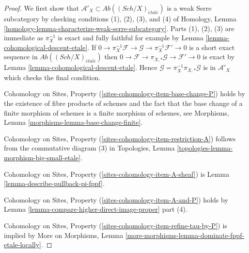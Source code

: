 \documentclass[10pt,a4paper]{amsart}
\theoremstyle{plain}
\theoremstyle{definition}
\theoremstyle{remark}
\numberwithin{equation}{subsection}
\def\Sch{\mathit{Sch}}
\def\etale{{\acute{e}tale}}
\begin{document}
\begin{proof}
We first show that $\mathcal{A}'_X \subset \textit{Ab}((\Sch/X)_\etale)$
is a weak Serre subcategory by checking conditions (1), (2), (3), and (4)
of Homology, Lemma \ref{homology-lemma-characterize-weak-serre-subcategory}.
Parts (1), (2), (3) are immediate as $\pi_X^{-1}$ is exact and
fully faithful for example by Lemma \ref{lemma-cohomological-descent-etale}. If
$0 \to \pi_X^{-1}\mathcal{F} \to \mathcal{G} \to \pi_X^{-1}\mathcal{F}' \to 0$
is a short exact sequence in $\textit{Ab}((\Sch/X)_\etale)$
then $0 \to \mathcal{F} \to \pi_{X, *}\mathcal{G} \to \mathcal{F}' \to 0$
is exact by Lemma \ref{lemma-cohomological-descent-etale}.
Hence $\mathcal{G} = \pi_X^{-1}\pi_{X, *}\mathcal{G}$ is in
$\mathcal{A}'_X$ which checks the final condition.

\medskip\noindent
Cohomology on Sites, Property (\ref{sites-cohomology-item-base-change-P}) holds
by the existence of fibre products of schemes
and the fact that the base change of a finite morphism of
schemes is a finite morphism of schemes, see
Morphisms, Lemma \ref{morphisms-lemma-base-change-finite}.

\medskip\noindent
Cohomology on Sites, Property (\ref{sites-cohomology-item-restriction-A})
follows from the commutative diagram (3) in
Topologies, Lemma \ref{topologies-lemma-morphism-big-small-etale}.

\medskip\noindent
Cohomology on Sites, Property (\ref{sites-cohomology-item-A-sheaf}) is
Lemma \ref{lemma-describe-pullback-pi-fppf}.

\medskip\noindent
Cohomology on Sites, Property (\ref{sites-cohomology-item-A-and-P}) holds by
Lemma \ref{lemma-compare-higher-direct-image-proper} part (4).

\medskip\noindent
Cohomology on Sites, Property (\ref{sites-cohomology-item-refine-tau-by-P})
is implied by
More on Morphisms, Lemma
\ref{more-morphisms-lemma-dominate-fppf-etale-locally}.
\end{proof}
\end{document}
